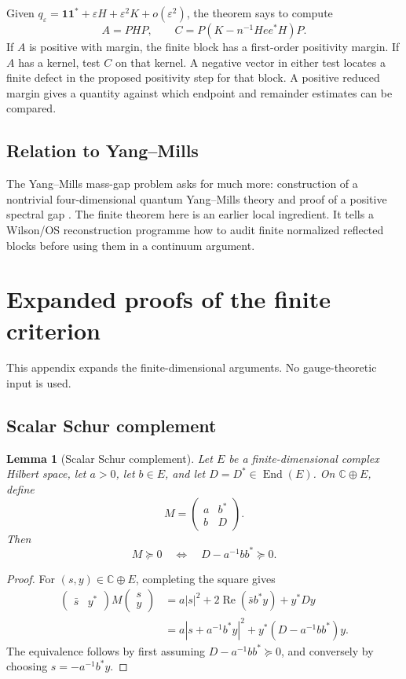 \documentclass[11pt]{article}
\newtheorem{lemma}[theorem]{Lemma}
\newcommand{\one}{\mathbf 1}
\newcommand{\C}{\mathbb C}
\newcommand{\eps}{\varepsilon}
\newcommand{\Ree}{\operatorname{Re}}
\begin{document}
Given \(q_\eps=\one\one^*+\eps H+\eps^2K+o(\eps^2)\), the theorem says to compute
\[
  A=PHP,
  \qquad
  C=P(K-n^{-1}Hee^*H)P.
\]
If \(A\) is positive with margin, the finite block has a first-order positivity margin.  If \(A\) has a kernel, test \(C\) on that kernel.  A negative vector in either test locates a finite defect in the proposed positivity step for that block.  A positive reduced margin gives a quantity against which endpoint and remainder estimates can be compared.

\subsection{Relation to Yang--Mills}

The Yang--Mills mass-gap problem asks for much more: construction of a nontrivial four-dimensional quantum Yang--Mills theory and proof of a positive spectral gap \cite{JaffeWitten2000,ClayYM}.  The finite theorem here is an earlier local ingredient.  It tells a Wilson/OS reconstruction programme how to audit finite normalized reflected blocks before using them in a continuum argument.

\section{Expanded proofs of the finite criterion}
\label{app:expanded-proofs}

This appendix expands the finite-dimensional arguments.  No gauge-theoretic input is used.

\subsection{Scalar Schur complement}

\begin{lemma}[Scalar Schur complement]
\label{lem:app-scalar-schur}
Let \(E\) be a finite-dimensional complex Hilbert space, let \(a>0\), let \(b\in E\), and let \(D=D^*\in\operatorname{End}(E)\).  On \(\C\oplus E\), define
\[
  M=\begin{pmatrix}a&b^*\\ b&D\end{pmatrix}.
\]
Then
\[
  M\succeq0\quad\Longleftrightarrow\quad D-a^{-1}bb^*\succeq0.
\]
\end{lemma}

\begin{proof}
For \((s,y)\in\C\oplus E\), completing the square gives
\begin{align*}
  \begin{pmatrix}\bar s&y^*\end{pmatrix}
  M
  \begin{pmatrix}s\\y\end{pmatrix}
  &=a|s|^2+2\Ree(\bar s b^*y)+y^*Dy\\
  &=a\left|s+a^{-1}b^*y\right|^2+y^*(D-a^{-1}bb^*)y.
\end{align*}
The equivalence follows by first assuming \(D-a^{-1}bb^*\succeq0\), and conversely by choosing \(s=-a^{-1}b^*y\).
\end{proof}
\end{document}
